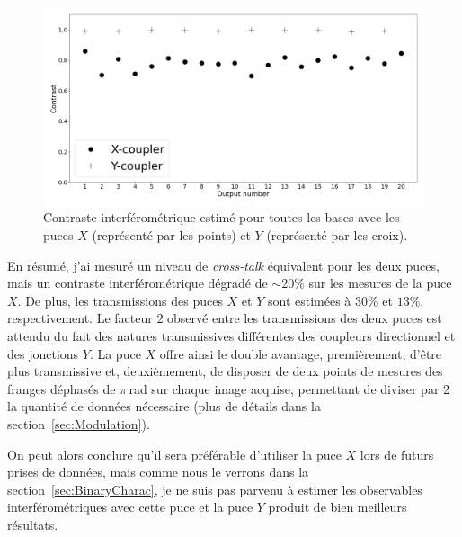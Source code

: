 \begin{figure}[ht!]
    \centering
    \includegraphics[width=\figwidth]{Figure_Chap2/ContrastComparison_20201124_20201119_LaTex.png}
    \caption[Contraste interférométrique estimé pour toutes les bases avec les puces $X$ et $Y$.]{Contraste interférométrique estimé pour toutes les bases avec les puces $X$ (représenté par les points) et $Y$ (représenté par les croix).}
    \label{fig:ChipContrast}
\end{figure}



En résumé, j'ai mesuré un niveau de \textit{cross-talk} équivalent pour les deux puces, mais un contraste interférométrique dégradé de $\sim 20\%$ sur les mesures de la puce $X$. De plus, les transmissions des puces $X$ et $Y$ sont estimées à $30\%$ et $13\%$, respectivement. Le facteur $2$ observé entre les transmissions des deux puces est attendu du fait des natures transmissives différentes des coupleurs directionnel et des jonctions $Y$. La puce $X$ offre ainsi le double avantage, premièrement, d'être plus transmissive et, deuxièmement, de disposer de deux points de mesures des franges déphasés de $\pi \,$rad sur chaque image acquise, permettant de diviser par 2 la quantité de données nécessaire (plus de détails dans la section~\ref{sec:Modulation}).

On peut alors conclure qu'il sera préférable d'utiliser la puce $X$ lors de futurs prises de données, mais comme nous le verrons dans la section~\ref{sec:BinaryCharac}, je ne suis pas parvenu à estimer les observables interférométriques avec cette puce et la puce $Y$ produit de bien meilleurs résultats.

